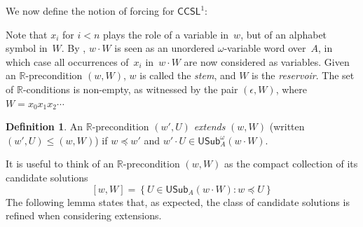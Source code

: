 \documentclass{article}
\def\RR{\mathbb{R}}
\newcommand{\CCSL}[0]{\mathsf{CCSL}}
\newcommand{\NN}[0]{\mathbb{N}}
\newcommand{\USub}{\mathsf{USub}}
\newcommand{\WSub}{\mathsf{WSub}}
\numberwithin{theorem}{section}
\theoremstyle{definition}
\newtheorem{remark}[theorem]{Remark}
\newtheorem{definition}[theorem]{Definition}
\newcommand{\upupharpoonright}{%
  \upharpoonright
  \mathrel{\mkern-4.5mu}%
  \upharpoonright
}
\newcommand{\uuh}{\upupharpoonright}
\begin{document}

We now define the notion of forcing for $\CCSL^1$:


Note that $x_i$ for $i < n$ plays the role of a variable in~$w$, but of an alphabet symbol in~$W$. By , $w \cdot W$ is seen as an unordered $\omega$-variable word over~$A$, in which case all occurrences of~$x_i$ in~$w \cdot W$ are now considered as variables.
Given an $\RR$-precondition $(w, W)$, $w$ is called the \emph{stem}, and $W$ is the \emph{reservoir}.
The set of $\RR$-conditions is non-empty, as witnessed by the pair $(\epsilon, W)$, where $W = x_0x_1x_2\cdots$

\begin{definition}
An $\RR$-precondition $(w', U)$ \emph{extends} $(w, W)$ (written $(w', U) \leq (w, W)$)
if $w \preceq w'$ and $w' \cdot U \in \USub^\omega_A(w \cdot W)$.
\end{definition}

It is useful to think of an $\RR$-precondition $(w, W)$ as the compact collection of its candidate solutions
$$
[w, W] = \left\{ U \in \USub_A(w \cdot W) : w \preceq U \right\}
$$
The following lemma states that, as expected, the class of candidate solutions is refined when considering extensions.
\end{document}
